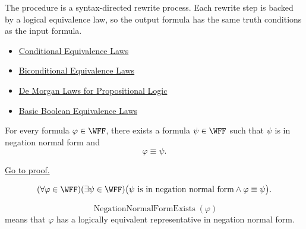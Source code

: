 \begin{remark*}[Interpretation]
The procedure is a syntax-directed rewrite process. Each rewrite step is backed
by a logical equivalence law, so the output formula has the same truth
conditions as the input formula.
\end{remark*}

\begin{dependencies}
\begin{itemize}
  \item \hyperref[thm:conditional-equivalence-laws-propositional-logic]{Conditional Equivalence Laws}
  \item \hyperref[thm:biconditional-equivalence-laws-propositional-logic]{Biconditional Equivalence Laws}
  \item \hyperref[thm:de-morgan-laws-propositional-logic]{De Morgan Laws for Propositional Logic}
  \item \hyperref[thm:basic-boolean-equivalence-laws-propositional-logic]{Basic Boolean Equivalence Laws}
\end{itemize}
\end{dependencies}

\begin{tcolorbox}[colback=thmbox, colframe=thmborder, arc=2pt,
  left=6pt, right=6pt, top=4pt, bottom=4pt,
  title={\small\textbf{Theorem (Existence of Negation Normal Form)}},
  fonttitle=\small\bfseries]
\begin{theorem}
\label{thm:existence-negation-normal-form-propositional-logic}
For every formula \(\varphi\in\WFF\), there exists a formula \(\psi\in\WFF\)
such that \(\psi\) is in negation normal form and
\[
\varphi\equiv\psi.
\]

\noindent\hyperref[prf:existence-negation-normal-form-propositional-logic]{Go to proof.}
\end{theorem}
\end{tcolorbox}

\begin{remark*}
\[
(\forall\varphi\in\WFF)(\exists\psi\in\WFF)
\bigl(\psi\text{ is in negation normal form}\land \varphi\equiv\psi\bigr).
\]
\end{remark*}

\begin{remark*}
\[
\operatorname{NegationNormalFormExists}(\varphi)
\]
means that \(\varphi\) has a logically equivalent representative in negation
normal form.
\end{remark*}

